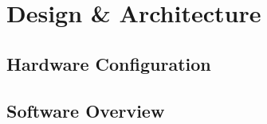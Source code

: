 \section{Design \& Architecture}


\subsection{Hardware Configuration}


\subsection{Software Overview}